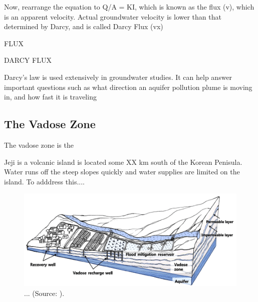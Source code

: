 \documentclass{book}\usepackage{knitr}
\begin{document}
\begin{knitrout}
\begin{kframe}
Now, rearrange the equation to Q/A = KI, which is known as the flux (v), which is an apparent velocity. Actual groundwater velocity is lower than that determined by Darcy, and is called Darcy Flux (vx)

FLUX

DARCY FLUX

Darcy's law is used extensively in groundwater studies. It can help answer important questions such as what direction an aquifer pollution plume is moving in, and how fast it is traveling

\subsection{The Vadose Zone}

The vadose zone is the 

Jeji is a volcanic island is located some XX km south of the Korean Penisula. Water runs off the steep slopes quickly and water supplies are limited on the island. To adddress this...\citet{lee2017fifty}.

\begin{figure}
\includegraphics[width=\linewidth]{images/critical-zone/Lee-Vadose.png}
\caption{... (Source: \citep{lee2017fifty}).}
\label{fig:vadose2}
\end{figure}




\end{kframe}
\end{knitrout}
\end{document}
